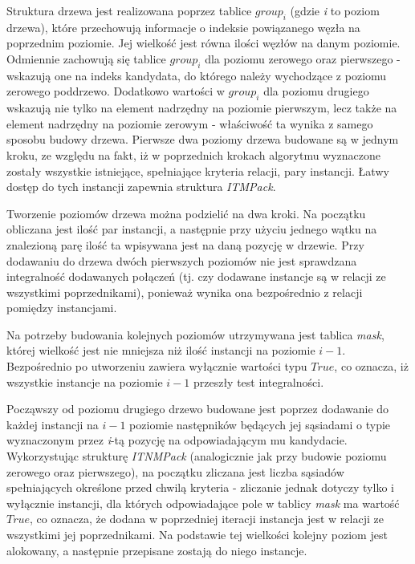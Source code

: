 \documentclass[12pt]{article}
\begin{document}
Struktura drzewa jest realizowana poprzez tablice $ group_{i} $ (gdzie \textit{i} to poziom drzewa),   które przechowują informacje o indeksie powiązanego węzła na poprzednim poziomie. Jej wielkość jest równa ilości węzłów na danym poziomie. Odmiennie zachowują się tablice $ group_{i} $ dla poziomu zerowego oraz pierwszego - wskazują one na indeks kandydata, do którego należy wychodzące z poziomu zerowego poddrzewo. Dodatkowo wartości w $ group_{i} $ dla poziomu drugiego wskazują nie tylko na element nadrzędny na poziomie pierwszym, lecz także na element nadrzędny na poziomie zerowym - właściwość ta wynika z samego sposobu budowy drzewa. Pierwsze dwa poziomy drzewa budowane są w jednym kroku, ze względu na fakt, iż w poprzednich krokach algorytmu wyznaczone zostały wszystkie istniejące, spełniające kryteria relacji, pary instancji. Łatwy dostęp do tych instancji zapewnia struktura \textit{ITMPack}. 

Tworzenie poziomów drzewa można podzielić na dwa kroki. Na początku obliczana jest ilość par instancji, a następnie przy użyciu jednego wątku na znalezioną parę ilość ta wpisywana jest na daną pozycję w drzewie. Przy dodawaniu do drzewa dwóch pierwszych poziomów nie jest sprawdzana integralność dodawanych połączeń (tj. czy dodawane instancje są w relacji ze wszystkimi poprzednikami), ponieważ wynika ona bezpośrednio z relacji pomiędzy instancjami.

Na potrzeby budowania kolejnych poziomów utrzymywana jest tablica \textit{mask}, której wielkość jest nie mniejsza niż ilość instancji na poziomie $ i - 1 $. Bezpośrednio po utworzeniu zawiera wyłącznie wartości typu $ True $, co oznacza, iż wszystkie instancje na poziomie $ i - 1 $ przeszły test integralności.

Począwszy od poziomu drugiego drzewo budowane jest poprzez dodawanie do każdej instancji na $ i - 1 $ poziomie następników będących jej sąsiadami o typie wyznaczonym przez \textit{i}-tą pozycję na odpowiadającym mu kandydacie. Wykorzystując strukturę \textit{ITNMPack} (analogicznie jak przy budowie poziomu zerowego oraz pierwszego), na początku zliczana jest liczba sąsiadów spełniających określone przed chwilą kryteria - zliczanie jednak dotyczy tylko i wyłącznie instancji, dla których odpowiadające pole w tablicy \textit{mask} ma wartość $ True $, co oznacza, że dodana w poprzedniej iteracji instancja jest w relacji ze wszystkimi jej poprzednikami. Na podstawie tej wielkości kolejny poziom jest alokowany, a następnie przepisane zostają do niego instancje.
\end{document}
